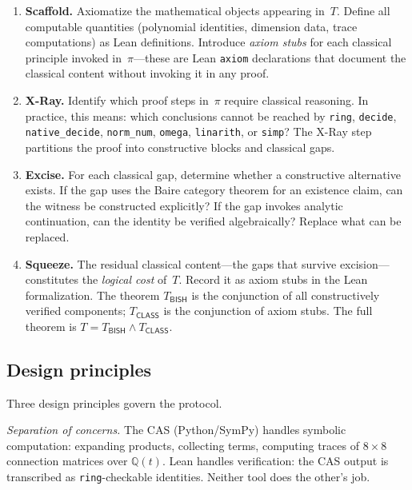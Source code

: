 \documentclass[11pt]{article}
\theoremstyle{plain}
\theoremstyle{definition}
\theoremstyle{remark}
\newcommand{\QQ}{\mathbb{Q}}
\newcommand{\BISH}{\mathsf{BISH}}
\newcommand{\CLASS}{\mathsf{CLASS}}
\begin{document}
\begin{enumerate}[label=\textbf{Step \arabic*.},leftmargin=3em]
\item \textbf{Scaffold.}  Axiomatize the mathematical objects
  appearing in~$T$.  Define all computable quantities (polynomial
  identities, dimension data, trace computations) as Lean
  definitions.  Introduce \emph{axiom stubs} for each classical
  principle invoked in~$\pi$---these are Lean \texttt{axiom}
  declarations that document the classical content without invoking
  it in any proof.

\item \textbf{X-Ray.}  Identify which proof steps in~$\pi$ require
  classical reasoning.  In practice, this means: which conclusions
  cannot be reached by \texttt{ring}, \texttt{decide},
  \texttt{native\_decide}, \texttt{norm\_num}, \texttt{omega},
  \texttt{linarith}, or \texttt{simp}?  The X-Ray step partitions
  the proof into constructive blocks and classical gaps.

\item \textbf{Excise.}  For each classical gap, determine whether a
  constructive alternative exists.  If the gap uses the Baire
  category theorem for an existence claim, can the witness be
  constructed explicitly?  If the gap invokes analytic continuation,
  can the identity be verified algebraically?  Replace what can be
  replaced.

\item \textbf{Squeeze.}  The residual classical content---the gaps
  that survive excision---constitutes the \emph{logical cost}
  of~$T$.  Record it as axiom stubs in the Lean formalization.  The
  theorem $T_{\BISH}$ is the conjunction of all constructively
  verified components; $T_{\CLASS}$ is the conjunction of axiom
  stubs.  The full theorem is $T = T_{\BISH} \wedge T_{\CLASS}$.
\end{enumerate}

\subsection{Design principles}

Three design principles govern the protocol.

\emph{Separation of concerns.}  The CAS (Python/SymPy) handles
symbolic computation: expanding products, collecting terms, computing
traces of $8 \times 8$ connection matrices over $\QQ(t)$.  Lean
handles verification: the CAS output is transcribed as
\texttt{ring}-checkable identities.  Neither tool does the other's
job.
\end{document}

